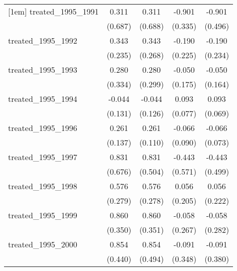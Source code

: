 {\begin{tabular}{l*{4}{c}}
[1em]
treated\_1995\_1991&       0.311         &       0.311         &      -0.901\sym{**} &      -0.901         \\
            &     (0.687)         &     (0.688)         &     (0.335)         &     (0.496)         \\
[1em]
treated\_1995\_1992&       0.343         &       0.343         &      -0.190         &      -0.190         \\
            &     (0.235)         &     (0.268)         &     (0.225)         &     (0.234)         \\
[1em]
treated\_1995\_1993&       0.280         &       0.280         &      -0.050         &      -0.050         \\
            &     (0.334)         &     (0.299)         &     (0.175)         &     (0.164)         \\
[1em]
treated\_1995\_1994&      -0.044         &      -0.044         &       0.093         &       0.093         \\
            &     (0.131)         &     (0.126)         &     (0.077)         &     (0.069)         \\
[1em]
treated\_1995\_1996&       0.261         &       0.261\sym{*}  &      -0.066         &      -0.066         \\
            &     (0.137)         &     (0.110)         &     (0.090)         &     (0.073)         \\
[1em]
treated\_1995\_1997&       0.831         &       0.831         &      -0.443         &      -0.443         \\
            &     (0.676)         &     (0.504)         &     (0.571)         &     (0.499)         \\
[1em]
treated\_1995\_1998&       0.576\sym{*}  &       0.576\sym{*}  &       0.056         &       0.056         \\
            &     (0.279)         &     (0.278)         &     (0.205)         &     (0.222)         \\
[1em]
treated\_1995\_1999&       0.860\sym{*}  &       0.860\sym{*}  &      -0.058         &      -0.058         \\
            &     (0.350)         &     (0.351)         &     (0.267)         &     (0.282)         \\
[1em]
treated\_1995\_2000&       0.854         &       0.854         &      -0.091         &      -0.091         \\
            &     (0.440)         &     (0.494)         &     (0.348)         &     (0.380)         \\

\end{tabular}}
